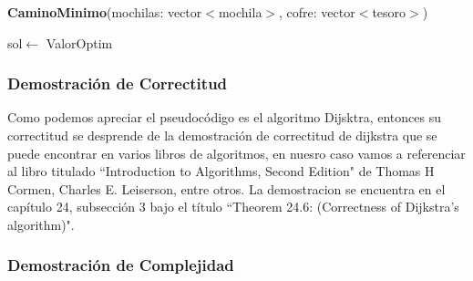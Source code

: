 \documentclass[spanish,12pt]{article}
\begin{document}
\begin{algorithm}[H]{\textbf{CaminoMinimo}(mochilas: vector$<$mochila$>$, cofre: vector$<$tesoro$>$)}
	\begin{algorithmic}[1]
		
		\State sol$\gets$ ValorOptim
	\end{algorithmic}
\end{algorithm}

\newpage

\subsubsection{Demostración de Correctitud}
Como podemos apreciar el pseudocódigo es el algoritmo Dijsktra, entonces su correctitud se desprende de la demostración de correctitud de dijkstra que se puede encontrar en varios libros de algoritmos, en nuesro caso vamos a referenciar al libro titulado ``Introduction to Algorithms, Second Edition"  de Thomas H Cormen, Charles E. Leiserson, entre otros. La demostracion se encuentra en el capítulo 24, subsección 3 bajo el título ``Theorem 24.6: (Correctness of Dijkstra's algorithm)". 

\subsubsection{Demostración de Complejidad}
\end{document}
